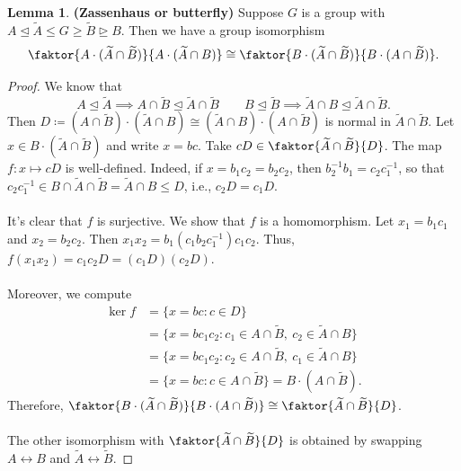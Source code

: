 \documentclass[10pt,letterpaper,cm]{nupset}
\theoremstyle{definition}
\newtheorem{lemma}{Lemma}
\newcommand{\1}{\mathbf{1}}
\newcommand{\0}{\vec 0}
\begin{document}
\begin{lemma}{\textbf{(Zassenhaus or butterfly)}}
Suppose $G$ is a group with $A \unlhd \widetilde{A} \leq G \geq \widetilde{B} \unrhd B$. Then we have a group isomorphism $$\faktor{A\cdot (\widetilde{A} \cap \widetilde{B})}{A \cdot (\widetilde{A} \cap B)} \cong \faktor{B \cdot (\widetilde{A} \cap \widetilde{B})}{B\cdot (A \cap \widetilde{B})}.$$
\end{lemma}
\begin{proof}
We know that $$A \unlhd \widetilde{A} \implies A \cap \widetilde{B} \unlhd \widetilde{A} \cap \widetilde{B} \quad \quad B \unlhd \widetilde{B} \implies \widetilde{A} \cap B \unlhd \widetilde{A} \cap \widetilde{B}.$$ 
Then $D\coloneqq  ({A} \cap \widetilde{B}) \cdot (\widetilde{A} \cap {B}) \cong  (\widetilde{A} \cap {B}) \cdot ({A} \cap \widetilde{B})$ is normal in $\widetilde{A} \cap \widetilde{B}$. Let $x \in B \cdot ( \widetilde{A} \cap \widetilde{B})$ and write $x = bc$. Take $cD \in \faktor{\widetilde{A} \cap \widetilde{B}}{D}$. The map $f: x \mapsto cD$ is well-defined. Indeed, if $x = b_1c_2 = b_2c_2$, then $b_2^{-1}b_1 = c_2c_1^{-1}$, so that $c_2c_1^{-1} \in B \cap \widetilde{A} \cap \widetilde{B} = \widetilde{A}\cap B \leq D$, i.e., $c_2D = c_1D$.
\\ \\It's clear that $f$ is surjective. We show that $f$ is a homomorphism. Let $x_1= b_1c_1$ and $x_2 = b_2c_2$. Then $x_1x_2 = b_1(c_1b_2c_1^{-1})c_1c_2$. Thus, $f(x_1x_2) = c_1c_2D = (c_1D)(c_2D)$.
\\ \\
Moreover, we compute 
\begin{align*} 
\ker f &= \{x = bc : c \in D\}  
\\ & = \{ x= bc_1c_2 : c_1\in {A} \cap \widetilde{B}, \  c_2 \in \widetilde{A} \cap {B}\}
\\ & = \{ x= bc_1c_2 : c_2\in {A} \cap \widetilde{B}, \  c_1 \in \widetilde{A} \cap {B}\} 
\\ & = \{x = bc : c \in A \cap \widetilde{B}\} = B \cdot (A \cap \widetilde{B}).
\end{align*} Therefore, $\faktor{B \cdot ( \widetilde{A} \cap \widetilde{B})}{ B \cdot (A \cap \widetilde{B})} \cong \faktor{\widetilde{A} \cap \widetilde{B}}{D}$. 
\\ \\ The other isomorphism with $\faktor{\widetilde{A} \cap \widetilde{B}}{D}$ is obtained by swapping $A \leftrightarrow B$ and $\widetilde{A} \leftrightarrow \widetilde{B}$.
\end{proof}
\end{document}
